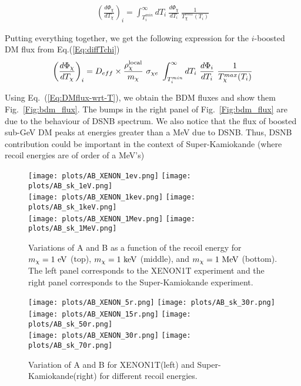 \documentclass[11pt,prd,twocolumn,nofootinbib,reprint,superscriptaddress,longbibliography,colorlinks=true,citecolor=blue]{revtex4-1}
\def\bea{\begin{eqnarray}}
\def\eea{\end{eqnarray}}
\begin{document}
 \bea
 \left(\frac{d\Phi_\chi}{dT_\chi}\right)_i = \int_{T_i^{min}}^\infty dT_i ~\frac{d\Phi_\chi}{dT_i}~ \frac{1}{T_\chi^{max}(T_i)}
 \eea
 
 Putting everything together, we get the following expression for the $i$-boosted DM flux from Eq.(\ref{Eq:diffTchi})
 \bea
 \left(\frac{d\Phi_\chi}{dT_\chi}\right)_i = D_{eff} \times \frac{\rho_\chi^{\rm{local}}}{m_\chi}~\sigma_{\chi e}~  \int^{\infty}_{T_i^{min}} dT_i ~ \frac{d\Phi_i}{dT_i}~ \frac{1}{T_\chi^{max}(T_i)} \nonumber \\
 \label{Eq:DMflux-wrt-T}
 \eea
 
 
 Using Eq.~(\ref{Eq:DMflux-wrt-T}), we obtain the BDM fluxes and show them Fig.~\ref{Fig:bdm_flux}. The bumps in the right panel of Fig.~\ref{Fig:bdm_flux} are due to the behaviour of DSNB spectrum. {We also notice that the flux of boosted sub-GeV DM peaks at energies greater than a MeV due to DSNB. Thus, DSNB contribution could be important in the context of Super-Kamiokande (where recoil energies are of order of a MeV's)}

\begin{figure*}[t]
\centering
\texttt{[image: plots/AB\_XENON\_1ev.png]}\hfill
\texttt{[image: plots/AB\_sk\_1eV.png]} \\[1mm]
\texttt{[image: plots/AB\_XENON\_1kev.png]}\hfill
\texttt{[image: plots/AB\_sk\_1keV.png]} \\[1mm]
\texttt{[image: plots/AB\_XENON\_1Mev.png]}\hfill
\texttt{[image: plots/AB\_sk\_1MeV.png]}
\caption{Variations of A and B as a function of the recoil energy for $m_\chi = 1~\rm{eV}$ (top), $m_\chi = 1~\rm{keV}$ (middle), and $m_\chi = 1~\rm{MeV}$ (bottom). 
The left panel corresponds to the XENON1T experiment and the right panel corresponds to the Super-Kamiokande experiment.}
\label{Fig:fixed_mass}
\end{figure*}



\begin{figure*}[t]
\centering
\texttt{[image: plots/AB\_XENON\_5r.png]}\hfill
\texttt{[image: plots/AB\_sk\_30r.png]}\\[1mm]
\texttt{[image: plots/AB\_XENON\_15r.png]}\hfill
\texttt{[image: plots/AB\_sk\_50r.png]}\\[1mm]
\texttt{[image: plots/AB\_XENON\_30r.png]}\hfill
\texttt{[image: plots/AB\_sk\_70r.png]}
\caption{Variation of A and B for XENON1T(left) and Super-Kamiokande(right) for different recoil energies. }
\label{Fig:fixed_ER}
\end{figure*}
%
\end{document}
